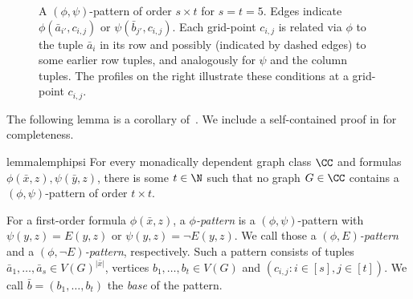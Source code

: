 \begin{figure}[htbp]
    \caption{A $(\phi,\psi)$-pattern of order $s\times t$ for $s=t=5$.
        Edges indicate $\phi(\bar a_{i'},c_{i,j})$ or $\psi(\bar b_{j'},c_{i,j})$.
        Each grid-point $c_{i,j}$ is related via $\phi$ to the tuple $\bar a_i$ in its row and possibly (indicated by dashed edges) to some earlier row tuples, and analogously for $\psi$ and the column tuples.
        The profiles on the right illustrate these conditions at a grid-point $c_{i,j}$.}
    \label{fig:phi-psi-pattern}
\end{figure}

\medskip
The following lemma is a corollary of~\cite[Lemma~C.1]{ordered-tww}. We include a self-contained proof in  for completeness.

\begin{restatable}{lemma}{lemphipsi}\label{lem:phi-psi-patterns}
    For every monadically dependent graph class $\CC$ and formulas $\phi(\bar x,z),\psi(\bar y,z)$, there is some $t\in\N$ such that no graph $G\in \CC$ contains a $(\phi,\psi)$-pattern of order $t \times t$.
\end{restatable}

\begin{definition}
    For a first-order formula $\phi(\bar x,z)$, a \emph{$\phi$-pattern} is a $(\phi,\psi)$-pattern
    with $\psi(y,z)=E(y,z)$ or $\psi(y,z)=\neg E(y,z)$.
    We call those a
    \emph{$(\phi,E)$-pattern}
    and a \emph{$(\phi,\neg E)$-pattern}, respectively.
    Such a pattern consists of tuples $\bar a_1,\ldots,\bar a_s\in V(G)^{|\bar x|}$,
    vertices $b_1,\ldots,b_t\in V(G)$ and $(c_{i,j}:i\in[s],j\in [t])$.
    We call $\bar b=(b_1,\ldots,b_t)$
    the \emph{base} of the pattern.

\end{definition}

